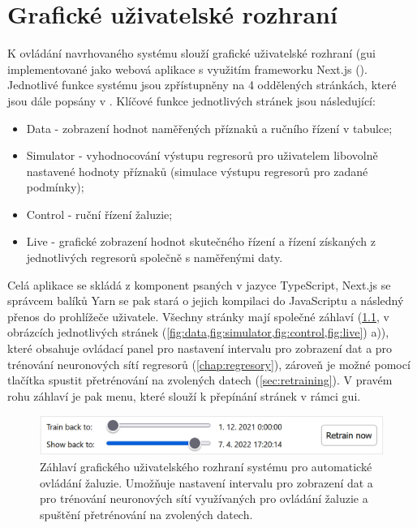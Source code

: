 \chapter{Grafické uživatelské rozhraní} \label{chap:gui}
    K ovládání navrhovaného systému slouží grafické uživatelské rozhraní (\acrshort{gui} implementované jako webová aplikace s využitím frameworku Next.js (\cite{vercel:nextjs}). Jednotlivé funkce systému jsou zpřístupněny na 4 oddělených stránkách, které jsou dále popsány v . Klíčové funkce jednotlivých stránek jsou následující:
    \begin{itemize}
        \item Data - zobrazení hodnot naměřených příznaků a ručního řízení v tabulce;
        \item Simulator - vyhodnocování výstupu regresorů pro uživatelem libovolně nastavené hodnoty příznaků (simulace výstupu regresorů pro zadané podmínky);
        \item Control - ruční řízení žaluzie;
        \item Live - grafické zobrazení hodnot skutečného řízení a řízení získaných z jednotlivých regresorů společně s naměřenými daty.
    \end{itemize}

    Celá aplikace se skládá z komponent psaných v jazyce TypeScript, Next.js se správcem balíků Yarn se pak stará o jejich kompilaci do JavaScriptu a následný přenos do prohlížeče uživatele. Všechny stránky mají společné záhlaví (\cref{fig:zahlavi}, v obrázcích jednotlivých stránek (\cref{fig:data,fig:simulator,fig:control,fig:live}) \textcolor{guired}{a)}), které obsahuje ovládací panel pro nastavení intervalu pro zobrazení dat a pro trénování neuronových sítí regresorů (\cref{chap:regresory}), zároveň je možné pomocí tlačítka spustit přetrénování na zvolených datech (\cref{sec:retraining}). V pravém rohu záhlaví je pak menu, které slouží k přepínání stránek v rámci \acrshort{gui}.
    \begin{figure}[h]
        \centering
        \includegraphics[draft=\draftfig,width=\textwidth]{img/gui/zahlavi.png}
        \caption[Záhlaví GUI]{Záhlaví grafického uživatelského rozhraní systému pro automatické ovládání žaluzie. Umožňuje nastavení intervalu pro zobrazení dat a pro trénování neuronových sítí využívaných pro ovládání žaluzie a spuštění přetrénování na zvolených datech.}
        \label{fig:zahlavi}
    \end{figure}
